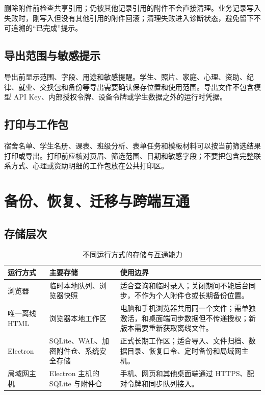 \documentclass[UTF8,zihao=-4,oneside]{ctexrep}
\begin{document}
删除附件前检查共享引用；仍被其他记录引用的附件不会直接清理。业务记录写入失败时，刚写入但没有其他引用的附件回滚；清理失败进入诊断状态，避免留下不可追溯的“已完成”提示。

\section{导出范围与敏感提示}

导出前显示范围、字段、用途和敏感提醒。学生、照片、家庭、心理、资助、纪律、就业、交换包和备份等导出需要确认保存位置和使用范围。导出文件不包含模型 API Key、内部授权令牌、设备令牌或学生数据之外的运行时凭据。

\section{打印与工作包}

宿舍名单、学生名册、课表、班级分析、表单任务和模板材料可以按当前筛选结果打印或导出。打印前应核对页眉、筛选范围、日期和敏感字段；不要把包含完整联系方式、心理或资助明细的工作包放在公共打印区。

\chapter{备份、恢复、迁移与跨端互通}

\section{存储层次}

\begin{table}[H]
\centering
\caption{不同运行方式的存储与互通能力}
\begin{tabularx}{\textwidth}{B{35mm} P{40mm} Y}
\toprule
运行方式 & 主要存储 & 使用边界 \\
\midrule
浏览器 & 临时本地队列、浏览器快照 & 适合查询和临时录入；关闭期间不能后台同步，不作为个人附件仓或长期备份位置。 \\
唯一离线 HTML & 浏览器本地工作区 & 电脑和手机浏览器共用同一个文件；需单独激活，和桌面端同步数据但不传递授权；新版本需要重新获取离线文件。 \\
Electron & SQLite、WAL、加密附件仓、系统安全存储 & 正式长期工作区；适合导入、文件归档、数据目录、恢复口令、定时备份和局域网主机。 \\
局域网主机 & Electron 主机的 SQLite 与附件仓 & 手机、网页和其他桌面端通过 HTTPS、配对令牌和同步队列接入。 \\
\bottomrule
\end{tabularx}
\end{table}
\end{document}
